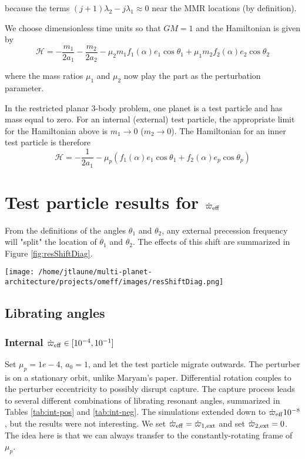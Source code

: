\documentclass[11pt]{article}
\begin{document}
\noindent
because the terms \((j+1)\lambda_2-j\lambda_1\approx 0\) near the MMR locations (by definition).

We choose dimensionless time units so that \(GM=1\) and
the Hamiltonian is given by
\begin{equation}
  \mathcal{H} = -\frac{m_1}{2a_1} -\frac{m_2}{2a_2} - \mu_2 m_1 f_1(\alpha) e_1 \cos\theta_1 + \mu_1 m_2 f_2(\alpha) e_2\cos\theta_2
\end{equation}

\noindent
where the mass ratios \(\mu_1\) and \(\mu_2\) now play the part as the perturbation parameter.

In the restricted planar 3-body problem, one planet is a test particle and has mass equal to zero.
For an internal (external) test particle,
the appropriate limit for the Hamiltonian above is \(m_1\to0\) (\(m_2\to0\)).
The Hamiltonian for an inner test particle is therefore
\begin{equation}
  \mathcal{H} = -\frac{1}{2a_1} - \mu_p( f_1(\alpha) e_1 \cos\theta_1 + f_2(\alpha) e_p\cos\theta_p)
\end{equation}

\noindent

\section{Test particle results for \(\dot\varpi_{\rm eff}\)}
\label{sec:orgffe4cb6}
From the definitions of the angles \(\theta_1\) and \(\theta_2\),
any external precession frequency will "split" the location
of \(\theta_1\) and \(\theta_2\). The effects of this
shift are summarized in Figure \ref{fig:resShiftDiag}.

\begin{center}
\texttt{[image: /home/jtlaune/multi-planet-architecture/projects/omeff/images/resShiftDiag.png]}
\end{center}

\subsection{Librating angles}
\label{sec:org2d9f9fe}
\subsubsection{Internal \(\dot\varpi_{\rm eff}\in[10^{-4},10^{-1}]\)}
\label{sec:org2efbeac}
Set \(\mu_p=1e-4\), \(a_0=1\), and let the test particle migrate
outwards. The perturber is on a stationary orbit, unlike Maryam's
paper. Differential rotation couples to the perturber eccentricity to
possibly disrupt capture.  The capture process leads to several
different combinations of librating resonant angles, summarized in
Tables \ref{tab:int-pos} and \ref{tab:int-neg}.  The simulations extended
down to \(\dot\varpi_{\rm eff}10^{-8}\), but the results were not
interesting.  We set \(\dot\varpi_{\rm eff} = \dot\varpi_{1,\rm ext}\)
and set \(\dot\varpi_{2, \rm ext}=0\). The idea here is
that we can always transfer to the constantly-rotating
frame of \(\mu_p\).
\end{document}
